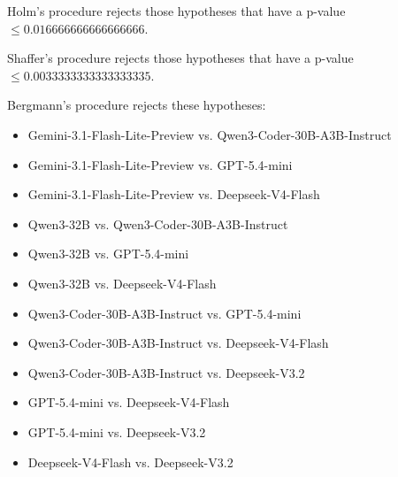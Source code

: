 \documentclass[a4paper,10pt]{article}
\begin{document}
\begin{landscape}
Holm's procedure rejects those hypotheses that have a p-value $\le0.016666666666666666$.


Shaffer's procedure rejects those hypotheses that have a p-value $\le0.0033333333333333335$.


Bergmann's procedure rejects these hypotheses:


\begin{itemize}


\item Gemini-3.1-Flash-Lite-Preview vs. Qwen3-Coder-30B-A3B-Instruct\item Gemini-3.1-Flash-Lite-Preview vs. GPT-5.4-mini\item Gemini-3.1-Flash-Lite-Preview vs. Deepseek-V4-Flash\item Qwen3-32B vs. Qwen3-Coder-30B-A3B-Instruct\item Qwen3-32B vs. GPT-5.4-mini\item Qwen3-32B vs. Deepseek-V4-Flash\item Qwen3-Coder-30B-A3B-Instruct vs. GPT-5.4-mini\item Qwen3-Coder-30B-A3B-Instruct vs. Deepseek-V4-Flash\item Qwen3-Coder-30B-A3B-Instruct vs. Deepseek-V3.2\item GPT-5.4-mini vs. Deepseek-V4-Flash\item GPT-5.4-mini vs. Deepseek-V3.2\item Deepseek-V4-Flash vs. Deepseek-V3.2\end{itemize}



\end{landscape}
\end{document}
